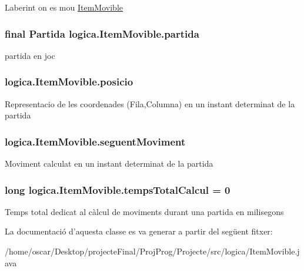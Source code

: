 Laberint on es mou \hyperlink{classlogica_1_1_item_movible}{Item\+Movible} \hypertarget{classlogica_1_1_item_movible_ace55b4918a7f671f89ed3109c91359e4}{
\subsubsection[{partida}]{\setlength{\rightskip}{0pt plus 5cm}final {\bf Partida} logica.\+Item\+Movible.\+partida\hspace{0.3cm}{\ttfamily [protected]}}}\label{classlogica_1_1_item_movible_ace55b4918a7f671f89ed3109c91359e4}
partida en joc \hypertarget{classlogica_1_1_item_movible_a9380636109f2180b48ee96e64de319a4}{
\subsubsection[{posicio}]{ logica.\+Item\+Movible.\+posicio\hspace{0.3cm}{\ttfamily [protected]}}}\label{classlogica_1_1_item_movible_a9380636109f2180b48ee96e64de319a4}
Representacio de les coordenades (Fila,Columna) en un instant determinat de la partida \hypertarget{classlogica_1_1_item_movible_a6e7ab9e5b0e363972a753e6b1550e7fb}{
\subsubsection[{seguent\+Moviment}]{ logica.\+Item\+Movible.\+seguent\+Moviment\hspace{0.3cm}{\ttfamily [protected]}}}\label{classlogica_1_1_item_movible_a6e7ab9e5b0e363972a753e6b1550e7fb}
Moviment calculat en un instant determinat de la partida \hypertarget{classlogica_1_1_item_movible_acc514a1b03e6f87bd157f334837ea7c0}{
\subsubsection[{temps\+Total\+Calcul}]{\setlength{\rightskip}{0pt plus 5cm}long logica.\+Item\+Movible.\+temps\+Total\+Calcul = 0\hspace{0.3cm}{\ttfamily [private]}}}\label{classlogica_1_1_item_movible_acc514a1b03e6f87bd157f334837ea7c0}
Temps total dedicat al càlcul de moviments durant una partida en milisegons 

La documentació d'aquesta classe es va generar a partir del següent fitxer\+:\begin{DoxyCompactItemize}
\item 
/home/oscar/\+Desktop/projecte\+Final/\+Proj\+Prog/\+Projecte/src/logica/Item\+Movible.\+java\end{DoxyCompactItemize}
